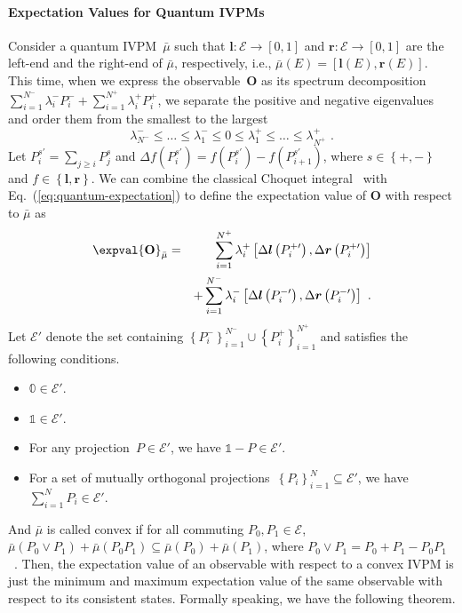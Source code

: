 \documentclass[english,reprint, aps, prl,superscriptaddress, showpacs,
showkeys, longbibliography, amsmath, amssymb]{revtex4-1}
\theoremstyle{plain}
\theoremstyle{definition}
\newcommand{\events}{\ensuremath{\mathcal{E}}}
\begin{document}
\paragraph{Expectation Values for Quantum IVPMs}

Consider a quantum IVPM~$\bar{\mu}$ such that $\boldsymbol{l}:\events\rightarrow\left[0,1\right]$
and $\boldsymbol{r}:\events\rightarrow\left[0,1\right]$ are the left-end
and the right-end of $\bar{\mu}$, respectively, i.e., $\bar{\mu}\left(E\right)=\left[\boldsymbol{l}\left(E\right),\boldsymbol{r}\left(E\right)\right]$.
This time, when we express the observable~$\mathbf{O}$ as its spectrum
decomposition~$\sum_{i=1}^{N^{-}}\lambda_{i}^{-}P_{i}^{-}+\sum_{i=1}^{N^{+}}\lambda_{i}^{+}P_{i}^{+}$,
we separate the positive and negative eigenvalues and order them from
the smallest to the largest 
\begin{equation}
\lambda_{N^{-}}^{-}\le\ldots\le\lambda_{1}^{-}\le0\le\lambda_{1}^{+}\le\ldots\le\lambda_{N^{+}}^{+}\textrm{ .}
\end{equation}
Let $P_{i}^{s\prime}=\sum_{j\ge i}P_{j}^{s}$ and $\Delta f\left(P_{i}^{s\prime}\right)=f\left(P_{i}^{s\prime}\right)-f\left(P_{i+1}^{s\prime}\right)$,
where $s\in\left\{ +,-\right\} $ and $f\in\left\{ \boldsymbol{l},\boldsymbol{r}\right\} $.
We can combine the classical Choquet integral~\cite{Vitali1925,Choquet1954,GilboaSchmeidler1994,Grabisch2016}
with Eq.~(\ref{eq:quantum-expectation}) to define the expectation
value of $\mathbf{O}$ with respect to $\bar{\mu}$ as
\begin{eqnarray}
\expval{\mathbf{O}}_{\bar{\mu}} & = & \sum_{i=1}^{N^{+}}\lambda_{i}^{+}\left[\Delta\boldsymbol{l}\left(P_{i}^{+\prime}\right),\Delta\boldsymbol{r}\left(P_{i}^{+\prime}\right)\right]\nonumber \\
 &  & +\sum_{i=1}^{N^{-}}\lambda_{i}^{-}\left[\Delta\boldsymbol{l}\left(P_{i}^{-\prime}\right),\Delta\boldsymbol{r}\left(P_{i}^{-\prime}\right)\right]\textrm{ .}\label{eq:quantum-interval-expectation}
\end{eqnarray}
Let $\events'$ denote the set containing $\left\{ P_{i}^{-}\right\} _{i=1}^{N^{-}}\cup\left\{ P_{i}^{+}\right\} _{i=1}^{N^{+}}$
and satisfies the following conditions.
\begin{itemize}
\item $\mathbb{0}\in\events'$. 
\item $\mathbb{1}\in\events'$. 
\item For any projection~$P\in\events'$, we have $\mathbb{1}-P\in\events'$. 
\item For a set of mutually orthogonal projections~$\left\{ P_{i}\right\} _{i=1}^{N}\subseteq\events'$,
we have $\sum_{i=1}^{N}P_{i}\in\events'$. 
\end{itemize}
And $\bar{\mu}$ is called convex if for all commuting $P_{0},P_{1}\in\events$,
$\bar{\mu}\left(P_{0}\vee P_{1}\right)+\bar{\mu}\left(P_{0}P_{1}\right)\subseteq\bar{\mu}\left(P_{0}\right)+\bar{\mu}\left(P_{1}\right)$,
where $P_{0}\vee P_{1}=P_{0}+P_{1}-P_{0}P_{1}$~\cite{Griffiths2003}.
Then, the expectation value of an observable with respect to a convex
IVPM is just the minimum and maximum expectation value of the same
observable with respect to its consistent states. Formally speaking,
we have the following theorem.
\end{document}
